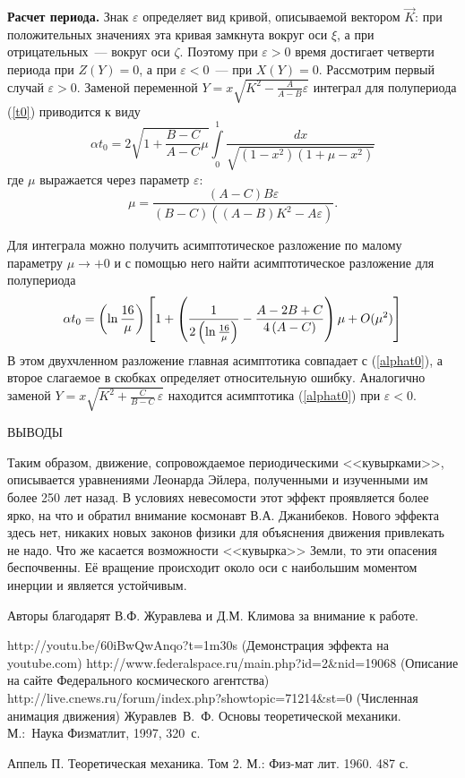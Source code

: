 \documentclass[14pt,a4paper]{extarticle}
\def\DS{\displaystyle}
\def\eps{\varepsilon}
\begin{document}
{\bf Расчет периода.} Знак $\varepsilon$ определяет вид кривой, описываемой вектором $\vec{K}$: при положительных значениях эта кривая замкнута вокруг оси $\xi$, а при отрицательных~--- вокруг оси $\zeta$. Поэтому при $\varepsilon>0$ время достигает четверти периода при $Z(Y)=0$, а при $\varepsilon<0$~--- при $X(Y)=0$. Рассмотрим первый случай $\eps>0$. Заменой переменной
$
Y=x\sqrt{K^2-\frac{A}{A-B}\eps}
$
интеграл для полупериода (\ref{t0})  приводится к виду
$$
\DS \alpha t_0=2\sqrt{1+\frac{B-C}{A-C}\mu}\int\limits_0^1\frac{dx}{\sqrt{(1-x^2)(1+\mu-x^2)}}
$$
где $\mu$ выражается через параметр $\eps$:
$$\mu =\frac{\left( A-C\right) B\eps}{\left(
B-C\right) \left( \left( A-B\right) K^{2}-A\eps\right) }.$$

Для интеграла можно получить асимптотическое разложение по малому параметру $\mu\rightarrow +0$
и с помощью него найти асимптотическое разложение для полупериода
$$\alpha t_{0}=
\left( \ln \frac{16}{\mu }\right) \left[ 1+\left( \frac{1}{2\left( \ln \frac{%
16}{\mu }\right) }-\frac{A-2B+C}{4\left( A-C\right) }\right) \mu +O(\mu ^{2})%
\right] $$
В этом двухчленном разложение главная асимптотика совпадает с (\ref{alphat0}), а второе слагаемое в скобках определяет относительную ошибку.
Аналогично заменой $Y=x\sqrt{K^2+\frac{C}{B-C}\,\varepsilon}$ находится асимптотика (\ref{alphat0}) при $\eps<0$.


\bigskip

{ВЫВОДЫ}


\smallskip
Таким образом, движение, сопровождаемое периодическими <<кувырками>>, описывается уравнениями Леонарда Эйлера, полученными и изученными им более 250 лет назад. В условиях невесомости этот эффект проявляется более ярко, на что и обратил внимание космонавт В.А. Джанибеков. Нового эффекта здесь нет, никаких новых законов физики для объяснения движения привлекать не надо. Что же касается возможности <<кувырка>> Земли, то эти опасения беспочвенны. Её вращение происходит около оси с наибольшим моментом инерции и является устойчивым.


\smallskip

Авторы благодарят В.Ф. Журавлева и Д.М. Климова за внимание к работе.

\bigskip

\begin{thebibliography}{99}
 http://youtu.be/60iBwQwAnqo?t=1m30s (Демонстрация эффекта на youtube.com)
 http://www.federalspace.ru/main.php?id=2\&nid=19068 (Описание на сайте Федерального космического агентства)
 http://live.cnews.ru/forum/index.php?showtopic=71214\&st=0 (Численная анимация движения)
 Журавлев~В.~Ф. Основы теоретической механики.
М.:~Наука Физматлит, 1997, 320~с.

 Аппель П. Теоретическая механика. Том 2. М.: Физ-мат лит. 1960. 487 с.
\end{thebibliography}
\end{document}
